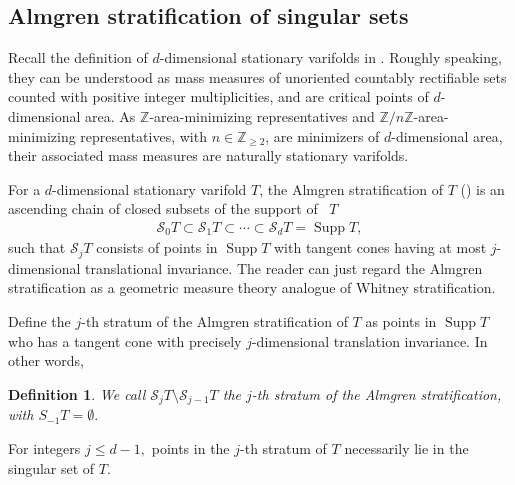 \documentclass[11pt,a4paper]{amsart}
\numberwithin{equation}{section}
\newcommand{\supp}{\operatorname{Supp}}
\newcommand{\cd}{\cdots}
\newcommand{\s}{\subset}
\newcommand{\Z}{\mathbb{Z}}
\theoremstyle{plain}
\newtheorem{defn}{Definition}[subsection]
\theoremstyle{definition}
\numberwithin{equation}{subsection}
\begin{document}
	\subsection{Almgren stratification of singular sets}\label{ssas}
	Recall the definition of $d$-dimensional stationary varifolds in \cite{WA}. Roughly speaking, they can be understood as mass measures of unoriented countably rectifiable sets counted with positive integer multiplicities, and are critical points of $d$-dimensional area. As $\Z$-area-minimizing representatives and $\Z/n\Z$-area-minimizing representatives, with $n\in \Z_{\ge2}$, are minimizers of $d$-dimensional area, their associated mass measures are naturally stationary varifolds.
	
	For a $d$-dimensional stationary varifold $T$, the Almgren stratification of $ T$ (\cite{BWst}) 
is an ascending chain of closed subsets of the support of  $T$
	\begin{align*}
	\mathcal{S}_0T\s\mathcal{{S}}_1T\s\cd\s\mathcal{S}_dT=\supp T,\end{align*}
	such that $\mathcal{S}_j T$ consists of points in $\supp T$ with tangent cones having at most $j$-dimensional translational invariance. The reader can just regard the Almgren stratification as a geometric measure theory analogue of Whitney stratification. 
	
	
	Define the $j$-th stratum of the Almgren stratification of $T$ as points in $\supp T$ who has a tangent cone with precisely $j$-dimensional translation invariance. In other words,
	\begin{defn}
	We call $\mathcal{S}_jT\setminus\mathcal{S}_{j-1}T$ the $j$-th stratum of the Almgren stratification, with $S_{-1}T=\emptyset.$
	\end{defn}
	For integers $j\le d-1,$ points in the $j$-th stratum of $T$ necessarily lie in the singular set of $T.$ 
	
\end{document}
